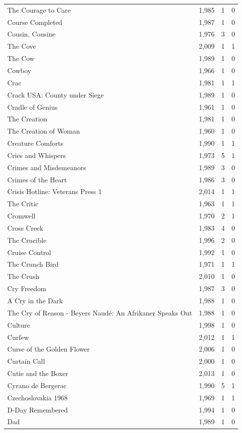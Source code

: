 \begin{tabular}{lrrr}
The Courage to Care & 1,985 & 1 & 0 \\
Course Completed & 1,987 & 1 & 0 \\
Cousin, Cousine & 1,976 & 3 & 0 \\
The Cove & 2,009 & 1 & 1 \\
The Cow & 1,989 & 1 & 0 \\
Cowboy & 1,966 & 1 & 0 \\
Crac & 1,981 & 1 & 1 \\
Crack USA: County under Siege & 1,989 & 1 & 0 \\
Cradle of Genius & 1,961 & 1 & 0 \\
The Creation & 1,981 & 1 & 0 \\
The Creation of Woman & 1,960 & 1 & 0 \\
Creature Comforts & 1,990 & 1 & 1 \\
Cries and Whispers & 1,973 & 5 & 1 \\
Crimes and Misdemeanors & 1,989 & 3 & 0 \\
Crimes of the Heart & 1,986 & 3 & 0 \\
Crisis Hotline: Veterans Press 1 & 2,014 & 1 & 1 \\
The Critic & 1,963 & 1 & 1 \\
Cromwell & 1,970 & 2 & 1 \\
Cross Creek & 1,983 & 4 & 0 \\
The Crucible & 1,996 & 2 & 0 \\
Cruise Control & 1,992 & 1 & 0 \\
The Crunch Bird & 1,971 & 1 & 1 \\
The Crush & 2,010 & 1 & 0 \\
Cry Freedom & 1,987 & 3 & 0 \\
A Cry in the Dark & 1,988 & 1 & 0 \\
The Cry of Reason - Beyers Naudé: An Afrikaner Speaks Out & 1,988 & 1 & 0 \\
Culture & 1,998 & 1 & 0 \\
Curfew & 2,012 & 1 & 1 \\
Curse of the Golden Flower & 2,006 & 1 & 0 \\
Curtain Call & 2,000 & 1 & 0 \\
Cutie and the Boxer & 2,013 & 1 & 0 \\
Cyrano de Bergerac & 1,990 & 5 & 1 \\
Czechoslovakia 1968 & 1,969 & 1 & 1 \\
D-Day Remembered & 1,994 & 1 & 0 \\
Dad & 1,989 & 1 & 0 \\

\end{tabular}
